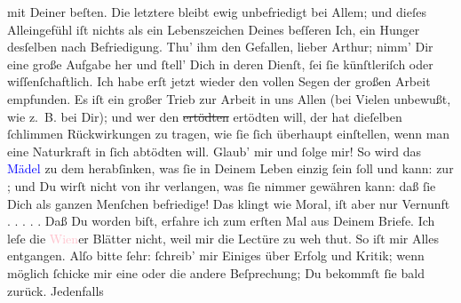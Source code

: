 \documentclass[twoside=false,titlepage=false,open=any, parskip=never, fontsize=12pt, headings=small, chapterprefix=false, appendixprefix=false]{scrbook}
\newcommand{\strikeout}[1]{\sout{#1}}
\newcommand{\dotsfive}{%
.\kern\ellipsisgap 
.\kern\ellipsisgap
.\kern\ellipsisgap
.\kern\ellipsisgap 
.\kern\ellipsisgap 
\relax}
\newcommand{\pbposition}{\depth}
\newcommand{\pb}{\nobreak\hspace{0pt}\raisebox{-0.1em}{\raisebox{\pbposition}{\textnormal{|}}}\nobreak\hspace{0pt}}
\begin{document}
               mit Deiner beſten. Die letztere bleibt ewig unbefriedigt bei Allem; und dieſes
               Alleingefühl iſt nichts als ein Lebenszeichen Deines beſſeren Ich, ein Hunger
               desſelben nach Befriedigung. Thu’ ihm den Gefallen, lieber Arthur; nimm’ Dir eine
               große Aufgabe her und ſtell’ Dich in deren Dienſt, ſei ſie künſtleriſch oder
               wiſſenſchaftlich. Ich habe erſt jetzt wieder den vollen Segen der großen Arbeit
               empfunden. Es iſt ein großer Trieb zur {\pb}Arbeit in
               uns Allen (bei Vielen unbewußt, wie z. B. bei Dir); und wer den \strikeout{ertödten} ertödten will, der hat dieſelben ſchlimmen
               Rückwirkungen zu tragen, wie ſie ſich überhaupt einſtellen, wenn man eine Naturkraft
               in ſich abtödten will. Glaub’ mir und ſolge mir! So wird das \textcolor{blue}{Mädel}{} zu dem herabſinken, was
               ſie in Deinem Leben einzig ſein ſoll und kann: zur \label{K_L02661-111v}\label{K_L02661-111h}; und Du wirſt nicht
               von ihr verlangen, was ſie nimmer gewähren kann: daß ſie Dich als ganzen Menſchen
               befriedige! Das klingt wie Moral, iſt aber nur Vernunft{\dotsfive}\pend
           \pstart
           Daß Du \label{K_L02661-2v}\label{K_L02661-2h} worden biſt, erfahre ich zum erſten Mal aus Deinem
               Briefe. Ich leſe die \textcolor{pink}{Wien}{}\ledrightnote{\textcolor{pink}{Wien}}er Blätter nicht, weil
               mir die Lectüre zu weh thut. So iſt mir Alles entgangen. Alſo bitte ſehr: ſchreib’
               mir Einiges {\pb}über Erfolg und Kritik; wenn möglich
               ſchicke mir eine oder die andere Beſprechung; Du bekommſt ſie bald zurück. Jedenfalls
\end{document}
